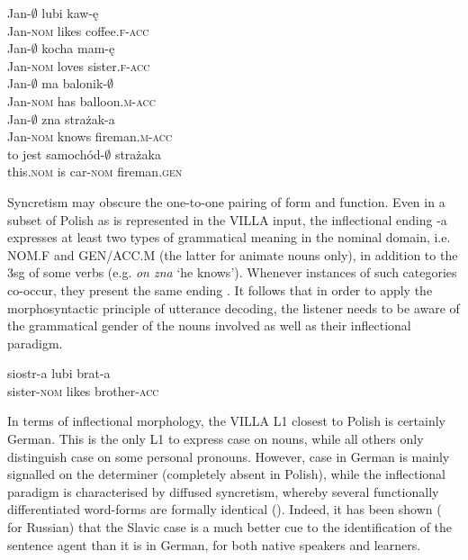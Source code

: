 \ea%
    \label{ex:02:4}
    \ea\label{ex:02:4a}
    \gll    Jan-${\emptyset}$ lubi kaw-ę\\
            Jan-\textsc{nom}  likes    coffee.\textsc{f}-\textsc{acc}\\
    \ex\label{ex:02:4b}
    \gll    Jan-${\emptyset}$ kocha mam-ę\\
            Jan-\textsc{nom} loves sister.\textsc{f-acc}\\
    \ex\label{ex:02:4c}
    \gll    Jan-${\emptyset}$ ma balonik-${\emptyset}$\\
            Jan-\textsc{nom} has balloon.\textsc{m-acc}\\
    \ex\label{ex:02:4d}
    \gll    Jan-${\emptyset}$ zna strażak-a\\
            Jan-\textsc{nom} knows fireman.\textsc{m-acc}\\
    \ex\label{ex:02:4e}
    \gll    to jest samochód-${\emptyset}$ strażaka\\
            this.\textsc{nom}  is  car-\textsc{nom}  fireman.\textsc{gen}\\
    \z
\z

Syncretism may obscure the one-to-one pairing of form and function. Even in a subset of Polish as is represented in the VILLA input, the inflectional ending -a expresses at least two types of grammatical meaning in the nominal domain, i.e. NOM.F and GEN/ACC.M (the latter for animate nouns only), in addition to the 3sg of some verbs (e.g. \textit{on zna} ‘he knows’). Whenever instances of such categories co-occur, they present the same ending . It follows that in order to apply the morphosyntactic principle of utterance decoding, the listener needs to be aware of the grammatical gender of the nouns involved as well as their inflectional paradigm.

\ea%
    \label{ex:02:5}
    \gll    siostr-a lubi brat-a\\
            sister-\textsc{nom}  likes  brother-\textsc{acc}\\
    \z

In terms of inflectional morphology, the VILLA L1 closest to Polish is certainly German. This is the only L1 to express case on nouns, while all others only distinguish case on some personal pronouns. However, case in German is mainly signalled on the determiner (completely absent in Polish), while the inflectional paradigm is characterised by diffused syncretism, whereby several functionally differentiated word-forms are formally identical (). Indeed, it has been shown (\citealt{KempeMacWhinney1998, KempeMacWhinney1999} for Russian) that the Slavic case is a much better cue to the identification of the sentence agent than it is in German, for both native speakers and learners.

